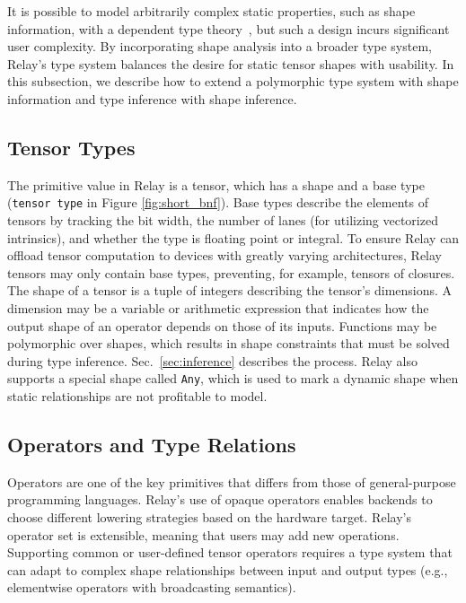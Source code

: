         It is possible to model arbitrarily complex static properties, such
          as shape information, with a dependent type theory~\citep{selsam_certigrad}, but such
          a design incurs significant user complexity.
        By incorporating shape analysis into a broader type system,
          Relay's type system balances the desire for static tensor shapes
          with usability.
        In this subsection, we describe how to extend a polymorphic type system with shape
          information and type inference with shape inference.

        \subsection*{Tensor Types}

        The primitive value in Relay is a tensor, which has
          a shape and a base type (\verb|tensor type| in Figure \ref{fig:short_bnf}).
        Base types describe the elements of tensors by tracking
          the bit width,
          the number of lanes (for utilizing vectorized intrinsics),
          and whether the type is floating point or integral.
        To ensure Relay can offload tensor computation to devices
          with greatly varying architectures,
          Relay tensors may only contain base types,
          preventing, for example, tensors of closures.
        The shape of a tensor is a tuple of integers describing the tensor's dimensions.
        A dimension may be a variable or arithmetic expression that indicates how the
          output shape of an operator depends on those of its inputs.
        Functions may be polymorphic over shapes, which results
          in shape constraints that must be solved during type inference.
        Sec.~\ref{sec:inference} describes the process.
        Relay also supports a special shape called \verb|Any|, which is used
          to mark a dynamic shape when static relationships are not profitable
          to model.

        \subsection*{Operators and Type Relations}
        Operators are one of the key primitives that differs from those of
          general-purpose programming languages.
        Relay's use of opaque operators enables backends to choose different
          lowering strategies based on the hardware target.
        Relay's operator set is extensible, meaning that users may add new operations.
        Supporting common or user-defined tensor operators requires a type system that can
          adapt to complex shape relationships between input and output types
          (e.g., elementwise operators with broadcasting semantics).

